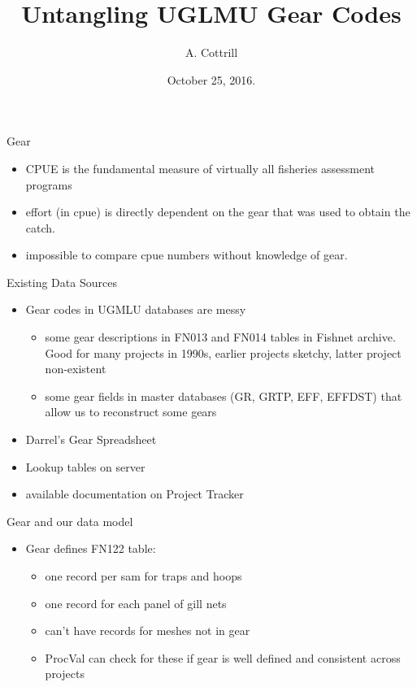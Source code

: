 \documentclass[bigger]{beamer}
\author{A. Cottrill}
\date{October 25, 2016.}
\title{Untangling UGLMU Gear Codes}
\begin{document}
\maketitle



\begin{frame}[label=sec-1]{Gear}
\begin{itemize}
\item CPUE is the fundamental measure of virtually all fisheries
assessment programs
\item effort (in cpue) is directly dependent on the gear that was used to
obtain the catch.
\item impossible to compare cpue numbers without knowledge of gear.
\end{itemize}
\end{frame}


\begin{frame}[label=sec-2]{Existing Data Sources}
\begin{itemize}
\item Gear codes in UGMLU databases are messy
\begin{itemize}
\item some gear descriptions in FN013 and FN014 tables in Fishnet
archive.  Good for many projects in 1990s, earlier projects sketchy,
latter project non-existent
\item some gear fields in master databases (GR, GRTP, EFF, EFFDST) that
allow us to reconstruct some gears
\end{itemize}
\item Darrel's Gear Spreadsheet
\item Lookup tables on server
\item available documentation on Project Tracker
\end{itemize}
\end{frame}

\begin{frame}[label=sec-3]{Gear and our data model}
\begin{itemize}
\item Gear defines FN122 table:
\begin{itemize}
\item one record per sam for traps and hoops
\item one record for each panel of gill nets
\item can't have records for meshes not in gear
\item ProcVal can check for these if gear is well defined and consistent
across projects
\end{itemize}
\end{itemize}
\end{frame}
\end{document}
